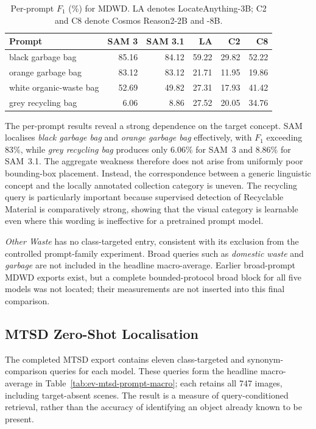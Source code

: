 \begin{table}[htbp]
\centering
\small
\caption{Per-prompt $F_1$ (\%) for \gls{MDWD}. LA denotes LocateAnything-3B; C2 and C8 denote Cosmos Reason2-2B and -8B.}
\label{tab:ev-mdwd-prompt-detail}
\renewcommand{\arraystretch}{1.15}
\begin{tabularx}{\textwidth}{@{}>{\raggedright\arraybackslash}Xrrrrr@{}}
\toprule
Prompt & SAM 3 & SAM 3.1 & LA & C2 & C8 \\
\midrule
black garbage bag & 85.16 & 84.12 & 59.22 & 29.82 & 52.22 \\
orange garbage bag & 83.12 & 83.12 & 21.71 & 11.95 & 19.86 \\
white organic-waste bag & 52.69 & 49.82 & 27.31 & 17.93 & 41.42 \\
grey recycling bag & 6.06 & 8.86 & 27.52 & 20.05 & 34.76 \\
\bottomrule
\end{tabularx}
\end{table}


The per-prompt results reveal a strong dependence on the target concept. SAM localises \emph{black garbage bag} and \emph{orange garbage bag} effectively, with \(F_1\) exceeding 83\%, while \emph{grey recycling bag} produces only 6.06\% for SAM~3 and 8.86\% for SAM~3.1. The aggregate weakness therefore does not arise from uniformly poor bounding-box placement. Instead, the correspondence between a generic linguistic concept and the locally annotated collection category is uneven. The recycling query is particularly important because supervised detection of Recyclable Material is comparatively strong, showing that the visual category is learnable even where this wording is ineffective for a pretrained prompt model.

\emph{Other Waste} has no class-targeted entry, consistent with its exclusion from the controlled prompt-family experiment. Broad queries such as \emph{domestic waste} and \emph{garbage} are not included in the headline macro-average. Earlier broad-prompt MDWD exports exist, but a complete bounded-protocol broad block for all five models was not located; their measurements are not inserted into this final comparison.

\subsection{MTSD Zero-Shot Localisation}
\label{sec:ev-mtsd-prompt}
The completed \gls{MTSD} export contains eleven class-targeted and synonym-comparison queries for each model. These queries form the headline macro-average in Table~\ref{tab:ev-mtsd-prompt-macro}; each retains all 747 images, including target-absent scenes. The result is a measure of query-conditioned retrieval, rather than the accuracy of identifying an object already known to be present.

